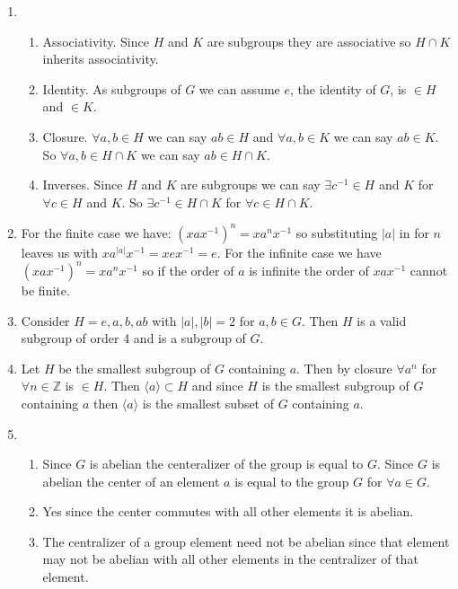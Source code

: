 \documentclass{article}
\begin{document}

\begin{enumerate}

\item 
	\begin{enumerate}
	\item Associativity. Since $H$ and $K$ are subgroups they are associative so $H\cap K$ inherits associativity.
	\item Identity. As subgroups of $G$ we can assume $e$, the identity of $G$, is $\in H$ and $\in K$.
	\item Closure. $\forall a,b \in H$ we can say $ab \in H$ and $\forall a,b \in K$ we can say $ab \in K$. So $\forall a,b \in H\cap K$ we can say $ab \in H\cap K$.
	\item Inverses. Since $H$ and $K$ are subgroups we can say $\exists c^{-1} \in H$ and $K$ for $\forall c \in H$ and $K$. So $\exists c^{-1} \in H \cap K$ for $ \forall c \in H\cap K$.
	\end{enumerate}
\item For the finite case we have: $(x a x^{-1})^{n} = x a^{n}x^{-1}$ so substituting $| a |$ in for $n$ leaves us with $x a ^{| a |} x ^{-1} = x e x^{-1} = e$. For the infinite case we have $(x a x^{-1})^{n} = x a^{n}x^{-1}$ so if the order of $a$ is infinite the order of $x a x^{-1}$ cannot be finite. 
\item Consider $H = {e,a,b,ab}$ with $|a|, |b| = 2$ for $a,b \in G$. Then $H$ is a valid subgroup of order 4 and is a subgroup of $G$.
\item Let $H$ be the smallest subgroup of $G$ containing $a$. Then by closure $\forall a^{n}$ for $\forall n \in \mathbb{Z}$ is $\in H$. Then $\langle a \rangle \subset H$ and since $H$ is the smallest subgroup of $G$ containing $a$ then $\langle a \rangle$ is the smallest subset of $G$ containing $a$. 
\item
	\begin{enumerate}
	\item Since $G$ is abelian the centeralizer of the group is equal to $G$. Since $G$ is abelian the center of an element $a$ is equal to the group $G$ for $\forall a \in G$.
	\item  Yes since the center commutes with all other elements it is abelian.
	\item The centralizer of a group element need not be abelian since that element may not be abelian with all other elements in the centralizer of that element. 
	\end{enumerate}
\end{enumerate}
\end{document}
